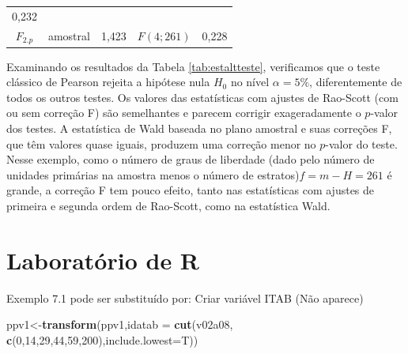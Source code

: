 \documentclass[]{book}
\newenvironment{Shaded}{\begin{snugshade}}{\end{snugshade}}
\newcommand{\KeywordTok}[1]{\textcolor[rgb]{0.13,0.29,0.53}{\textbf{#1}}}
\newcommand{\DataTypeTok}[1]{\textcolor[rgb]{0.13,0.29,0.53}{#1}}
\newcommand{\DecValTok}[1]{\textcolor[rgb]{0.00,0.00,0.81}{#1}}
\newcommand{\NormalTok}[1]{#1}
\theoremstyle{definition}
\theoremstyle{definition}
\theoremstyle{definition}
\theoremstyle{remark}
\begin{document}
\begin{longtable}[]{@{}cclcr@{}}
\begin{minipage}[t]{0.07\columnwidth}
0,232\strut
\end{minipage}\tabularnewline
\begin{minipage}[t]{0.40\columnwidth}\centering\strut
\(F_{2.p}\)\strut
\end{minipage} & \begin{minipage}[t]{0.15\columnwidth}\centering\strut
amostral\strut
\end{minipage} & \begin{minipage}[t]{0.05\columnwidth}\raggedright\strut
1,423\strut
\end{minipage} & \begin{minipage}[t]{0.19\columnwidth}\centering\strut
\(F\left( 4;261\right)\)\strut
\end{minipage} & \begin{minipage}[t]{0.07\columnwidth}\raggedleft\strut
0,228\strut
\end{minipage}\tabularnewline
\bottomrule
\end{longtable}

Examinando os resultados da Tabela \ref{tab:estaltteste}, verificamos
que o teste clássico de Pearson rejeita a hipótese nula \(H_{0}\) no
nível \(\alpha =5\%\), diferentemente de todos os outros testes. Os
valores das estatísticas com ajustes de Rao-Scott (com ou sem correção
F) são semelhantes e parecem corrigir exageradamente o \(p\)-valor dos
testes. A estatística de Wald baseada no plano amostral e suas correções
F, que têm valores quase iguais, produzem uma correção menor no
\(p\)-valor do teste. Nesse exemplo, como o número de graus de liberdade
(dado pelo número de unidades primárias na amostra menos o número de
estratos)\(f=m-H=261\) é grande, a correção F tem pouco efeito, tanto
nas estatísticas com ajustes de primeira e segunda ordem de Rao-Scott,
como na estatística Wald.

\section{Laboratório de R}\label{laboratorio-de-r-4}

Exemplo 7.1 pode ser substituído por: Criar variável ITAB (Não aparece)

\begin{Shaded}
\begin{Highlighting}[]
\NormalTok{ppv1<-}\KeywordTok{transform}\NormalTok{(ppv1,}\DataTypeTok{idatab =} \KeywordTok{cut}\NormalTok{(v02a08,}
\KeywordTok{c}\NormalTok{(}\DecValTok{0}\NormalTok{,}\DecValTok{14}\NormalTok{,}\DecValTok{29}\NormalTok{,}\DecValTok{44}\NormalTok{,}\DecValTok{59}\NormalTok{,}\DecValTok{200}\NormalTok{),}\DataTypeTok{include.lowest=}\NormalTok{T))}
\end{Highlighting}
\end{Shaded}
\end{document}
